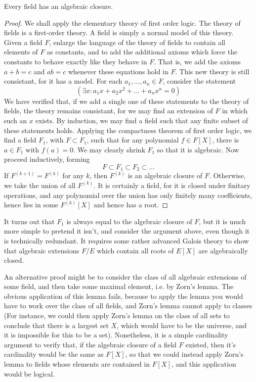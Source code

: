 \begin{theorem}
    Every field has an algebraic closure.
\end{theorem}
\begin{proof}
    We shall apply the elementary theory of first order logic. The theory of fields is a first-order theory. A field is simply a normal model of this theory. Given a field $F$, enlarge the language of the theory of fields to contain all elements of $F$ as constants, and to add the additional axioms which force the constants to behave exactly like they behave in $F$. That is, we add the axioms $a + b = c$ and $ab = c$ whenever these equations hold in $F$. This new theory is still consistant, for it has a model. For each $a_1, \dots, a_n \in F$, consider the statement
    \[ (\exists x: a_1 x + a_2 x^2 + \dots + a_n x^n = 0) \]
    We have verified that, if we add a single one of these statements to the theory of fields, the theory remains consistant, for we may find an extension of $F$ in which such an $x$ exists. By induction, we may find a field such that any finite subset of these statements holds. Applying the compactness theorem of first order logic, we find a field $F_1$, with $F \subset F_1$, such that for any polynomial $f \in F[X]$, there is $a \in F_1$ with $f(a) = 0$. We may clearly shrink $F_1$ so that it is algebraic. Now proceed inductively, forming
    \[ F \subset F_1 \subset F_2 \subset \dots \]
    If $F^{(k+1)} = F^{(k)}$ for any $k$, then $F^{(k)}$ is an algebraic closure of $F$. Otherwise, we take the union of all $F^{(k)}$. It is certainly a field, for it is closed under finitary operations, and any polynomial over the union has only finitely many coefficients, hence lies in some $F^{(k)}[X]$ and hence has a root.
\end{proof}

\begin{remark}
	It turns out that $F_1$ is always equal to the algebraic closure of $F$, but it is much more simple to pretend it isn't, and consider the argument above, even though it is technically redundant. It requires some rather advanced Galois theory to show that algebraic extensions $F/E$ which contain all roots of $E[X]$ are algebraically closed.
\end{remark}

An alternative proof might be to consider the class of all algebraic extensions of some field, and then take some maximal element, i.e. by Zorn's lemma. The obvious application of this lemma fails, because to apply the lemma you would have to work over the class of all fields, and Zorn's lemma cannot apply to classes (For instance, we could then apply Zorn's lemma on the class of all sets to conclude that there is a largest set $X$, which would have to be the universe, and it is impossible for this to be a set). Nonetheless, it is a simple cardinality argument to verify that, if the algebraic closure of a field $F$ existed, then it's cardinality would be the same as $F[X]$, so that we could instead apply Zorn's lemma to fields whose elements are contained in $F[X]$, and this application would be logical.

